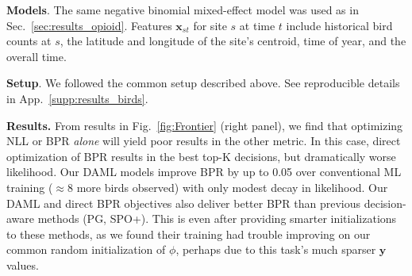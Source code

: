 
\textbf{Models}. The same negative binomial mixed-effect model was used as in Sec.~\ref{sec:results_opioid}. Features $\bm{x}_{st}$ for site $s$ at time $t$ include historical bird counts at $s$, the latitude and longitude of the site's centroid, time of year, and the overall time.

\textbf{Setup}. We followed the common setup described above.
See reproducible details in App.~\ref{supp:results_birds}.


\textbf{Results.} From results in Fig.~\ref{fig:Frontier} (right panel), we find that optimizing NLL or BPR \emph{alone} will yield poor results in the other metric. In this case, direct optimization of BPR results in the best top-K decisions, but dramatically worse likelihood. Our DAML models improve BPR by up to 0.05 over conventional ML training ($\approx$8 more birds observed) with only modest decay in likelihood. 
Our DAML and direct BPR objectives also deliver better BPR than previous decision-aware methods (PG, SPO+). 
This is even after providing smarter initializations to these methods, as we found their training had trouble improving on our common random initialization of $\phi$, perhaps due to this task's much sparser $\bm{y}$ values.




